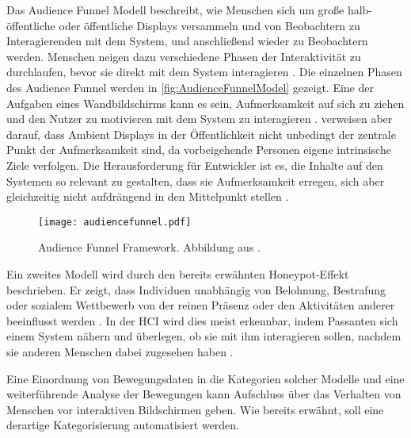Das Audience Funnel Modell \citep{wouters_uncovering_2016, mai_audience_2018} beschreibt,
wie Menschen sich um große halb-öffentliche oder öffentliche Displays versammeln
und von Beobachtern zu Interagierenden mit dem System, und anschließend wieder zu Beobachtern werden.
Menschen neigen dazu verschiedene Phasen der Interaktivität zu durchlaufen,
bevor sie direkt mit dem System interagieren \citep{wouters_uncovering_2016, mai_audience_2018}.
Die einzelnen Phasen des Audience Funnel werden in \autoref{fig:AudienceFunnelModel} gezeigt.
Eine der Aufgaben eines Wandbildschirms kann es sein, Aufmerksamkeit auf sich zu ziehen
und den Nutzer zu motivieren mit dem System zu interagieren \citep{mai_audience_2018}.
\citet{mai_audience_2018} verweisen aber darauf, dass Ambient Displays in der Öffentlichkeit
nicht unbedingt der zentrale Punkt der Aufmerksamkeit sind, da vorbeigehende Personen eigene intrinsische Ziele verfolgen.
Die Herausforderung für Entwickler ist es, die Inhalte auf den Systemen so relevant zu gestalten,
dass sie Aufmerksamkeit erregen, sich aber gleichzeitig nicht aufdrängend in den Mittelpunkt stellen \citep{mai_audience_2018}.
\begin{figure}[ht]
    \begin{center}
    \texttt{[image: audiencefunnel.pdf]}
    \end{center}
    \caption{Audience Funnel Framework. Abbildung aus \citet{mai_audience_2018}.}
    \label{fig:AudienceFunnelModel}
  \end{figure}

Ein zweites Modell wird durch den bereits erwähnten Honeypot-Effekt beschrieben.
Er zeigt, dass Individuen unabhängig von Belohnung, Bestrafung oder sozialem Wettbewerb
von der reinen Präsenz oder den Aktivitäten anderer beeinflusst werden \citep{wouters_uncovering_2016}.
In der \ac{HCI} wird dies meist erkennbar, indem Passanten sich einem System nähern
und überlegen, ob sie mit ihm interagieren sollen,
nachdem sie anderen Menschen dabei zugesehen haben \citep{wouters_uncovering_2016}.

Eine Einordnung von Bewegungsdaten in die Kategorien solcher Modelle
und eine weiterführende Analyse der Bewegungen kann Aufschluss über das Verhalten von Menschen
vor interaktiven Bildschirmen geben.
Wie bereits erwähnt, soll eine derartige Kategorisierung automatisiert werden.

